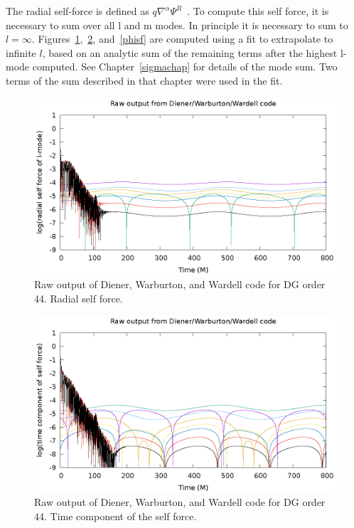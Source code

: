 The radial self-force is defined as $q\nabla^\alpha\Psi^{R}$~\cite{wardell_vega_thornburg_diener}. To compute this self force, it is necessary to sum over all l and m modes. In principle it is necessary to sum to $l=\infty$. Figures~\ref{rsf},~\ref{tsf}, and~\ref{phisf} are computed using a fit to extrapolate to infinite $l$, based on an analytic sum of the remaining terms after the highest l-mode computed. See Chapter~\ref{sigmachap} for details of the mode sum. Two terms of the sum described in that chapter were used in the fit.


\begin{figure}
  \includegraphics{rawRadialSelForceModes}
  \caption{Raw output of Diener, Warburton, and Wardell code for DG order 44. Radial self force.}
  \label{rsf}
\end{figure}

\begin{figure}
  \includegraphics{rawTimeSelfForceModes}
  \caption{Raw output of Diener, Warburton, and Wardell code for DG order 44. Time component of the self force.}
  \label{tsf}
\end{figure}

